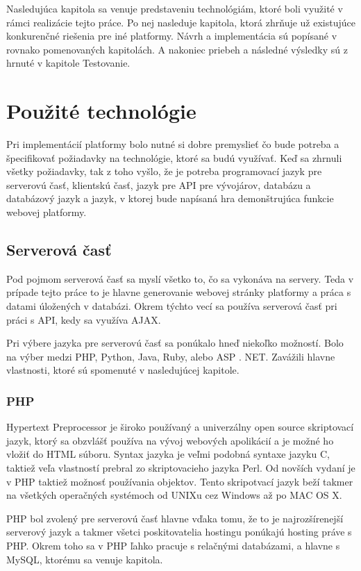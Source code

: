 Nasledujúca kapitola sa venuje predstaveniu technológiám, ktoré boli využité v rámci realizácie tejto práce. Po nej nasleduje kapitola, ktorá zhrňuje už existujúce konkurenčné riešenia pre iné platformy. Návrh a implementácia sú popísané v rovnako pomenovaných kapitolách. A nakoniec priebeh a následné výsledky sú z hrnuté v kapitole Testovanie.

\chapter{Použité technológie}
\label{chap:technologie}
Pri implementácií platformy bolo nutné si dobre premyslieť čo bude potreba a špecifikovať požiadavky na technológie, ktoré sa budú využívať. Keď sa zhrnuli všetky požiadavky, tak z toho vyšlo, že je potreba programovací jazyk pre serverovú časť, klientskú časť, jazyk pre API pre vývojárov, databázu a databázový jazyk a jazyk, v ktorej bude napísaná hra demonštrujúca funkcie webovej platformy.

\section{Serverová časť}
\label{sec:server}
Pod pojmom serverová časť sa myslí všetko to, čo sa vykonáva na servery. Teda v prípade tejto práce to je hlavne generovanie webovej stránky platformy a práca s datami úložených v databázi. Okrem týchto vecí sa používa serverová časť pri práci s API, kedy sa využíva AJAX.

Pri výbere jazyka pre serverovú časť sa ponúkalo hneď niekoľko možností. Bolo na výber medzi PHP, Python, Java, Ruby, alebo ASP . NET. Zavážili hlavne vlastnosti, ktoré sú spomenuté v nasledujúcej kapitole.
 

\subsection{PHP}
\label{sec:php}
Hypertext Preprocessor je široko používaný a univerzálny open source skriptovací jazyk, ktorý sa obzvlášť používa na vývoj webových apolikácií a je možné ho vložiť do HTML súboru. Syntax jazyka je veľmi podobná syntaxe jazyku C, taktiež veľa vlastností prebral zo skriptovacieho jazyka Perl. Od novších vydaní je v PHP taktiež možnosť používania objektov. Tento skripotvací jazyk beží takmer na všetkých operačných systémoch od UNIXu cez Windows až po MAC OS X.

PHP bol zvolený pre serverovú časť hlavne vďaka tomu, že to je najrozšírenejší serverový jazyk a takmer všetci poskitovatelia hostingu ponúkajú hosting práve s PHP. Okrem toho sa v PHP ľahko pracuje s relačnými databázami, a hlavne s MySQL, ktorému sa venuje kapitola.

